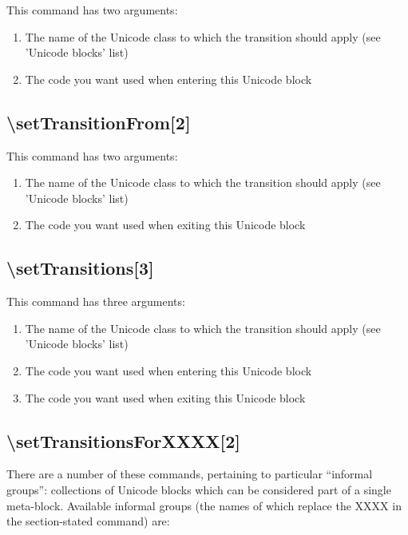 ﻿\documentclass{article}
\newenvironment{numberlist}{%
  \begin{enumerate}
	\setlength{\itemsep}{0pt}
	\setlength{\parsep}{0pt}
	\setlength{\topsep}{0pt}
	\setlength{\partopsep}{0pt}
	\setlength{\parskip}{0pt}
	\setlength{\labelsep}{5pt}}%
{
  \end{enumerate}}
\begin{document}
			This command has two arguments:

			\begin{numberlist}
				\item The name of the Unicode class to which the transition should apply (see 'Unicode blocks' list)
				\item The code you want used when entering this Unicode block
			\end{numberlist}

		\subsection{\textbackslash setTransitionFrom[2]}

			This command has two arguments:

			\begin{numberlist}
				\item The name of the Unicode class to which the transition should apply (see 'Unicode blocks' list)
				\item The code you want used when exiting this Unicode block
			\end{numberlist}

		\subsection{\textbackslash setTransitions[3]}

			This command has three arguments:

			\begin{numberlist}
				\item The name of the Unicode class to which the transition should apply (see 'Unicode blocks' list)
				\item The code you want used when entering this Unicode block
				\item The code you want used when exiting this Unicode block
			\end{numberlist}

		\subsection{\textbackslash setTransitionsForXXXX[2]}

			There are a number of these commands, pertaining to particular “informal groups”: collections of Unicode blocks which can be considered part of a single meta-block. Available informal groups (the names of which replace the XXXX in the section-stated command) are:
\end{document}
